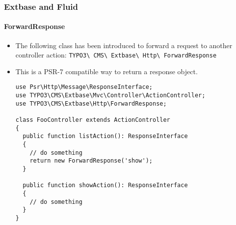 %

\begin{frame}[fragile]
	\frametitle{Extbase and Fluid}
	\framesubtitle{ForwardResponse}


	\begin{itemize}
		\item The following class has been introduced to forward a request to
			another controller action:
			\small\texttt{TYPO3\textbackslash
				CMS\textbackslash
				Extbase\textbackslash
				Http\textbackslash
				ForwardResponse}\normalsize
		\item This is a PSR-7 compatible way to return a response object.
\begin{lstlisting}
use Psr\Http\Message\ResponseInterface;
use TYPO3\CMS\Extbase\Mvc\Controller\ActionController;
use TYPO3\CMS\Extbase\Http\ForwardResponse;

class FooController extends ActionController
{
  public function listAction(): ResponseInterface
  {
    // do something
    return new ForwardResponse('show');
  }

  public function showAction(): ResponseInterface
  {
    // do something
  }
}
\end{lstlisting}

	\end{itemize}

\end{frame}

